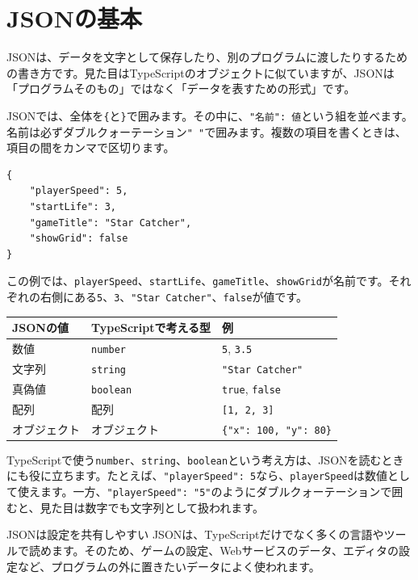 \section{JSONの基本}

JSONは、データを文字として保存したり、別のプログラムに渡したりするための書き方です。見た目はTypeScriptのオブジェクトに似ていますが、JSONは「プログラムそのもの」ではなく「データを表すための形式」です。

JSONでは、全体を\texttt{\{}と\texttt{\}}で囲みます。その中に、\texttt{"名前": 値}という組を並べます。名前は必ずダブルクォーテーション\texttt{" "}で囲みます。複数の項目を書くときは、項目の間をカンマで区切ります。

\begin{listing}[htbp]
\begin{verbatim}
{
    "playerSpeed": 5,
    "startLife": 3,
    "gameTitle": "Star Catcher",
    "showGrid": false
}
\end{verbatim}
\caption{JSONの基本的な書き方}
\label{lst:chapter16-json-basic}
\end{listing}

この例では、\texttt{playerSpeed}、\texttt{startLife}、\texttt{gameTitle}、\texttt{showGrid}が名前です。それぞれの右側にある\texttt{5}、\texttt{3}、\texttt{"Star Catcher"}、\texttt{false}が値です。

\begin{center}
\begin{tabular}{lll}
\toprule
JSONの値 & TypeScriptで考える型 & 例 \\
\midrule
数値 & \texttt{number} & \texttt{5}, \texttt{3.5} \\
文字列 & \texttt{string} & \texttt{"Star Catcher"} \\
真偽値 & \texttt{boolean} & \texttt{true}, \texttt{false} \\
配列 & 配列 & \texttt{[1, 2, 3]} \\
オブジェクト & オブジェクト & \texttt{\{"x": 100, "y": 80\}} \\
\bottomrule
\end{tabular}
\end{center}

TypeScriptで使う\texttt{number}、\texttt{string}、\texttt{boolean}という考え方は、JSONを読むときにも役に立ちます。たとえば、\texttt{"playerSpeed": 5}なら、\texttt{playerSpeed}は数値として使えます。一方、\texttt{"playerSpeed": "5"}のようにダブルクォーテーションで囲むと、見た目は数字でも文字列として扱われます。

\begin{pointbox}{JSONは設定を共有しやすい}
JSONは、TypeScriptだけでなく多くの言語やツールで読めます。そのため、ゲームの設定、Webサービスのデータ、エディタの設定など、プログラムの外に置きたいデータによく使われます。
\end{pointbox}

